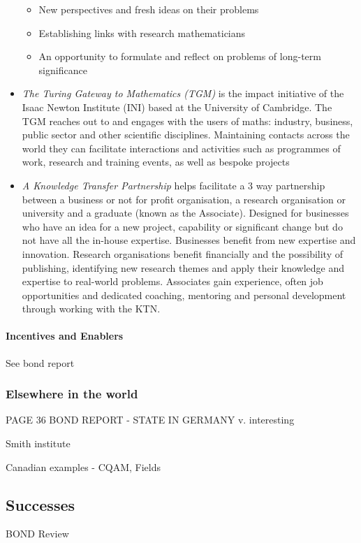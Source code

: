 \documentclass[11pt]{article} %
\begin{document}
\begin{itemize}
\begin{itemize}
			\item New perspectives and fresh ideas on their problems
			\item Establishing links with research mathematicians
			\item An opportunity to formulate and reflect on problems  of long-term significance
		\end{itemize}	
		\item \textit{The Turing Gateway to Mathematics (TGM)} is the impact initiative of the Isaac Newton Institute (INI) based at the University of Cambridge. The TGM reaches out to and engages with the users of maths: industry, business, public sector and other scientific disciplines. Maintaining contacts across the world they can facilitate interactions and activities such as programmes of work, research and training events, as well as bespoke projects
		\item  \textit{A Knowledge Transfer Partnership} helps facilitate a 3 way partnership between a business or not for profit organisation, a research organisation or university and a graduate (known as the Associate). Designed for businesses who have an idea for a new project, capability or significant change but  do not have all the in-house expertise. Businesses benefit from new expertise and innovation. Research organisations benefit financially and  the possibility of publishing, identifying new research themes and apply their knowledge and expertise to real-world problems. Associates gain experience, often job opportunities and dedicated coaching, mentoring and personal development through working with the KTN.
		
	
	\end{itemize}

\paragraph{Incentives and Enablers} 
		See bond report 
		
	\subsubsection{Elsewhere in the world }	
PAGE 36 BOND REPORT - STATE IN GERMANY v. interesting 
		

	Smith institute
	
	Canadian examples - CQAM, Fields 
	
	\subsection{Successes}
	BOND Review 
	
\end{document}

